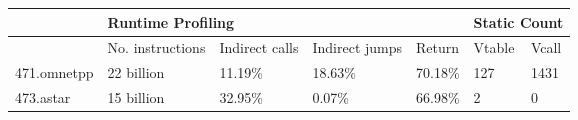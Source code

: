 \bgroup
\def\arraystretch{1.5}
\begin{tabular}{l|llll|ll}
            & \multicolumn{4}{l|}{Runtime Profiling}                       & \multicolumn{2}{l|}{Static Count} \\ \hline
            & No. instructions & Indirect calls & Indirect jumps & Return  & Vtable           & Vcall          \\ \hline
471.omnetpp & 22 billion       & 11.19\%        & 18.63\%        & 70.18\% & 127              & 1431           \\
473.astar   & 15 billion       & 32.95\%        & 0.07\%         & 66.98\% & 2                & 0              \\ \hline
\end{tabular}
\egroup